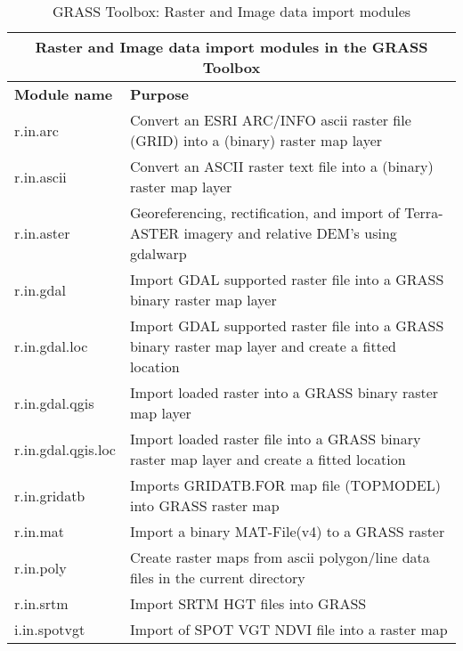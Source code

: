 \begin{table}[ht]
\centering
\caption{GRASS Toolbox: Raster and Image data import modules}\medskip
 \begin{tabular}{|p{4cm}|p{12cm}|}
  \hline \multicolumn{2}{|c|}{\textbf{Raster and Image data import modules in the GRASS
  Toolbox}} \\ 
  \hline \textbf{Module name} & \textbf{Purpose} \\
  \hline r.in.arc & Convert an ESRI ARC/INFO ascii raster file (GRID) into a
  (binary) raster map layer\\
  \hline r.in.ascii & Convert an ASCII raster text file into a (binary)
  raster map layer \\
  \hline r.in.aster & Georeferencing, rectification, and import of
  Terra-ASTER imagery and relative DEM's using gdalwarp \\
  \hline r.in.gdal &  Import GDAL supported raster file into a GRASS binary
  raster map layer \\
  \hline r.in.gdal.loc &  Import GDAL supported raster file into a GRASS
  binary raster map layer and create a fitted location \\
  \hline r.in.gdal.qgis & Import loaded raster into a GRASS binary raster map
  layer \\
  \hline r.in.gdal.qgis.loc &  Import loaded raster file into a GRASS binary
  raster map layer and create a fitted location \\
  \hline r.in.gridatb & Imports GRIDATB.FOR map file (TOPMODEL) into GRASS
  raster map \\
  \hline r.in.mat  & Import a binary MAT-File(v4) to a GRASS raster  \\
  \hline r.in.poly  &  Create raster maps from ascii polygon/line data files
  in the current directory \\
  \hline r.in.srtm  & Import SRTM HGT files into GRASS \\
  \hline i.in.spotvgt & Import of SPOT VGT NDVI file into a raster map \\
\hline
\end{tabular}
\end{table}

\newpage

